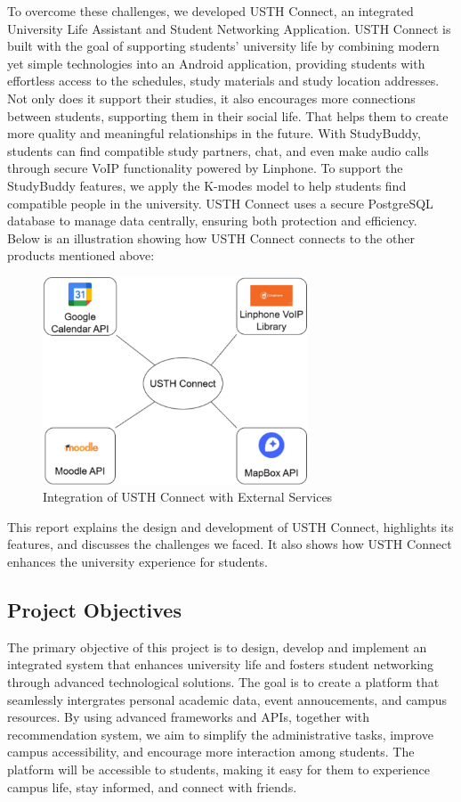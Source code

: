 \documentclass[12pt]{article}
\begin{document}
To overcome these challenges, we developed USTH Connect, an integrated University Life Assistant and Student Networking Application. 
USTH Connect is built with the goal of supporting students' university life by combining modern yet simple technologies into an Android application, providing students with effortless access to the schedules, study materials and study location addresses.
Not only does it support their studies, it also encourages more connections between students, supporting them in their social life. That helps them to create more quality and meaningful relationships in the future.
With StudyBuddy, students can find compatible study partners, chat, and even make audio calls through secure VoIP functionality powered by Linphone.
To support the StudyBuddy features, we apply the K-modes model to help students find compatible people in the university.
USTH Connect uses a secure PostgreSQL database to manage data centrally, ensuring both protection and efficiency.\\

Below is an illustration showing how USTH Connect connects to the other products mentioned above: 
\begin{figure}[H]
    \centering
    \includegraphics[width=0.7\textwidth]{image/Integration-USTH-Connect-External-Services.pdf} 
    \caption{Integration of USTH Connect with External Services}
    \label{fig:integration-external-services}
\end{figure}

This report explains the design and development of USTH Connect, highlights its features, and discusses the challenges we faced. 
It also shows how USTH Connect enhances the university experience for students.

\subsection{Project Objectives}
The primary objective of this project is to design, develop and implement an integrated system that enhances university life and fosters student networking through advanced technological solutions.
The goal is to create a platform that seamlessly intergrates personal academic data, event annoucements, and campus resources.
By using advanced frameworks and APIs, together with recommendation system, we aim to simplify the administrative tasks, improve campus accessibility, 
and encourage more interaction among students.
The platform will be accessible to students, making it easy for them to experience campus life, stay informed, and connect with friends.
\end{document}
